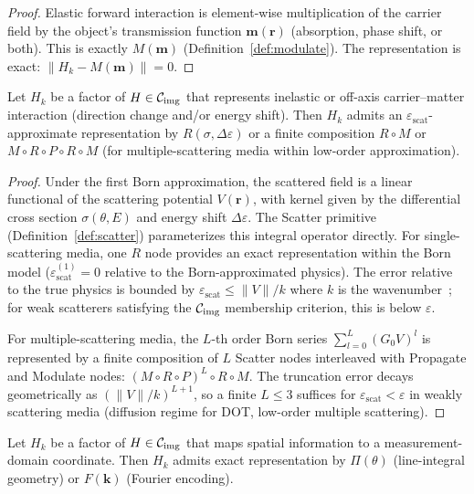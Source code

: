 \documentclass[11pt]{article}
\begin{document}
\begin{proof}
Elastic forward interaction is element-wise multiplication of the carrier field by the object's transmission function $\mathbf{m}(\mathbf{r})$ (absorption, phase shift, or both). This is exactly $M(\mathbf{m})$ (Definition~\ref{def:modulate}). The representation is exact: $\|H_k - M(\mathbf{m})\| = 0$.
\end{proof}

\begin{lemma}
\label{lem:scatter}
Let $H_k$ be a factor of $H \in \mathcal{C}_{\mathrm{img}}$ that represents inelastic or off-axis carrier--matter interaction (direction change and/or energy shift). Then $H_k$ admits an $\varepsilon_{\mathrm{scat}}$-approximate representation by $R(\sigma, \Delta\varepsilon)$ or a finite composition $R \circ M$ or $M \circ R \circ P \circ R \circ M$ (for multiple-scattering media within low-order approximation).
\end{lemma}

\begin{proof}
Under the first Born approximation, the scattered field is a linear functional of the scattering potential $V(\mathbf{r})$, with kernel given by the differential cross section $\sigma(\theta, E)$ and energy shift $\Delta\varepsilon$. The Scatter primitive (Definition~\ref{def:scatter}) parameterizes this integral operator directly. For single-scattering media, one $R$ node provides an exact representation within the Born model ($\varepsilon_{\mathrm{scat}}^{(1)} = 0$ relative to the Born-approximated physics). The error relative to the true physics is bounded by $\varepsilon_{\mathrm{scat}} \leq \|V\|/k$ where $k$ is the wavenumber~\cite{born1999principles}; for weak scatterers satisfying the $\mathcal{C}_{\mathrm{img}}$ membership criterion, this is below $\varepsilon$.

For multiple-scattering media, the $L$-th order Born series $\sum_{l=0}^{L} (G_0 V)^l$ is represented by a finite composition of $L$ Scatter nodes interleaved with Propagate and Modulate nodes: $(M \circ R \circ P)^L \circ R \circ M$. The truncation error decays geometrically as $(\|V\|/k)^{L+1}$, so a finite $L \leq 3$ suffices for $\varepsilon_{\mathrm{scat}} < \varepsilon$ in weakly scattering media (diffusion regime for DOT, low-order multiple scattering).
\end{proof}

\begin{lemma}
\label{lem:encode}
Let $H_k$ be a factor of $H \in \mathcal{C}_{\mathrm{img}}$ that maps spatial information to a measurement-domain coordinate. Then $H_k$ admits exact representation by $\Pi(\theta)$ (line-integral geometry) or $F(\mathbf{k})$ (Fourier encoding).
\end{lemma}
\end{document}
